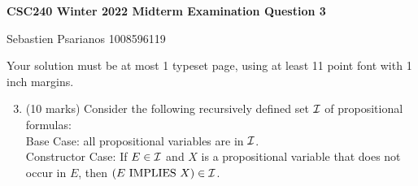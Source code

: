 \documentclass[11pt]{article}
\newcommand{\Implies}{\mbox{ IMPLIES }}
\begin{document}
\begin{center}
{\bf \Large \bf CSC240 Winter 2022 Midterm Examination Question 3}\\
\begin{solution}
Sebastien Psarianos 1008596119
\end{solution}
\end{center}

\begin{question}
Your solution must be at most 1 typeset page, using at least 11 point font with 1 inch margins.
\end{question}


\begin{enumerate}
\setcounter{enumi}{2}
\item
\begin{question}
(10 marks)
Consider the following recursively defined set ${\cal I}$ of propositional formulas:\\
Base Case: all propositional variables are in ${\cal I}$.\\
Constructor Case: If $E \in {\cal I}$ and $X$ is a propositional variable that does not occur in $E$, then $(E \Implies X) \in {\cal I}$.


\end{question}
\end{enumerate}
\end{document}
